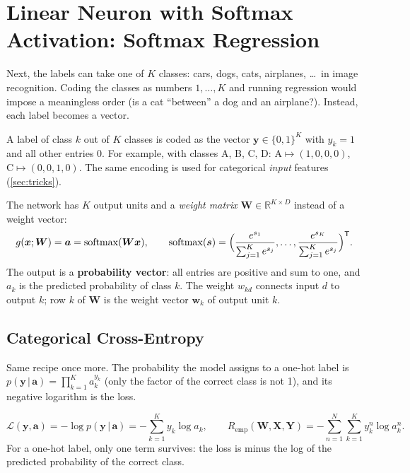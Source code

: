\documentclass[11pt, oneside]{book}
\newcommand{\R}{\mathbb{R}}
\newcommand{\Prob}{\mathbb{P}}           %
\newcommand{\T}{^{\mathsf{T}}}           %
\newcommand{\loss}{\mathcal{L}}          %
\newcommand{\params}{\boldsymbol{\theta}}   %
\DeclareMathOperator{\softmax}{softmax}
\newcommand{\given}{\,\vert\,}           %
\newcommand{\bx}{\bm{x}}        \newcommand{\by}{\bm{y}}
\newcommand{\bw}{\bm{w}}        \newcommand{\bW}{\bm{W}}
\newcommand{\ba}{\bm{a}}        \newcommand{\bs}{\bm{s}}
\newcommand{\bX}{\bm{X}}        \newcommand{\bY}{\bm{Y}}
\newcommand{\Remp}{R_{\mathrm{emp}}}     %
\let\originalsection\section
\renewcommand{\section}{\Needspace{7\baselineskip}\originalsection}
\let\originalsubsection\subsection
\renewcommand{\subsection}{\Needspace{6\baselineskip}\originalsubsection}
\begin{document}
\section{Linear Neuron with Softmax Activation: Softmax Regression}
\label{sec:softmax}

Next, the labels can take one of $K$ classes: cars, dogs, cats, airplanes,
\ldots\ in image recognition. Coding the classes as numbers $1, \dots, K$ and
running regression would impose a meaningless order (is a cat ``between''
a dog and an airplane?). Instead, each label becomes a vector.

\begin{defbox}[title={One-hot encoding}]
A label of class $k$ out of $K$ classes is coded as the vector
$\by \in \{0,1\}^K$ with $y_k = 1$ and all other entries $0$. For example,
with classes A, B, C, D: $\text{A} \mapsto (1,0,0,0)$, $\text{C} \mapsto
(0,0,1,0)$. The same encoding is used for categorical \emph{input}
features (\cref{sec:tricks}).
\end{defbox}

\begin{defbox}[title={Softmax regression}]
The network has $K$ output units and a \emph{weight matrix}
$\bW \in \R^{K \times D}$ instead of a weight vector:
\[
  g(\bx; \bW) = \ba = \softmax(\bW\bx), \qquad
  \softmax(\bs) = \Bigl(\frac{e^{s_1}}{\sum_{j=1}^K e^{s_j}}, \dots,
                        \frac{e^{s_K}}{\sum_{j=1}^K e^{s_j}}\Bigr)\T .
\]
The output is a \textbf{probability vector}: all entries are positive and
sum to one, and $a_k$ is the predicted probability of class $k$. The weight
$w_{kd}$ connects input $d$ to output $k$; row $k$ of $\bW$ is the weight
vector $\bw_k$ of output unit $k$.
\end{defbox}

\subsection{Categorical Cross-Entropy}

Same recipe once more. The probability the model assigns to a one-hot label
is $p(\by \given \ba) = \prod_{k=1}^K a_k^{y_k}$ (only the factor of the
correct class is not 1), and its negative logarithm is the loss.

\begin{defbox}[title={Categorical cross-entropy}]
\[
  \loss(\by, \ba) = -\log p(\by \given \ba) = -\sum_{k=1}^{K} y_k \log a_k,
  \qquad
  \Remp(\bW, \bX, \bY) = -\sum_{n=1}^{N}\sum_{k=1}^{K} y^n_k \log a^n_k .
\]
For a one-hot label, only one term survives: the loss is minus the log of
the predicted probability of the correct class.
\end{defbox}
\end{document}
